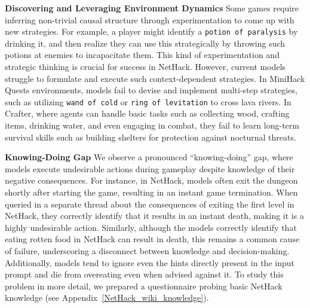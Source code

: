 \textbf{Discovering and Leveraging Environment Dynamics} Some games require inferring non-trivial causal structure through experimentation to come up with new strategies. For example, a player might identify a \texttt{\small{potion of paralysis}} by drinking it, and then realize they can use this strategically by throwing such potions at enemies to incapacitate them. This kind of experimentation and strategic thinking is crucial for success in NetHack. However, current models struggle to formulate and execute such context-dependent strategies. %
In MiniHack Quests environments, models fail to devise and implement multi-step strategies, such as utilizing \texttt{\small{wand of cold}} or \texttt{\small{ring of levitation}} to cross lava rivers.
In Crafter, where agents can handle basic tasks such as collecting wood, crafting items, drinking water, and even engaging in combat, they fail to learn long-term survival skills such as building shelters for protection against nocturnal threats.










\textbf{Knowing-Doing Gap} We observe a pronounced ``knowing-doing'' gap, where models execute undesirable actions during gameplay despite knowledge of their negative consequences. For instance, in NetHack, models often exit the dungeon shortly after starting the game, resulting in an instant game termination. When queried in a separate thread about the consequences of exiting the first level in NetHack, they correctly identify that it results in an instant death, making it is a highly undesirable action. Similarly, although the models correctly identify that eating rotten food in NetHack can result in death, this remains a common cause of failure, underscoring a disconnect between knowledge and decision-making. Additionally, models tend to ignore even the hints directly present in the input prompt and die from overeating even when advised against it. To study this problem in more detail, we prepared a questionnaire probing basic NetHack knowledge  (see Appendix~\ref{NetHack_wiki_knowledge}).
















